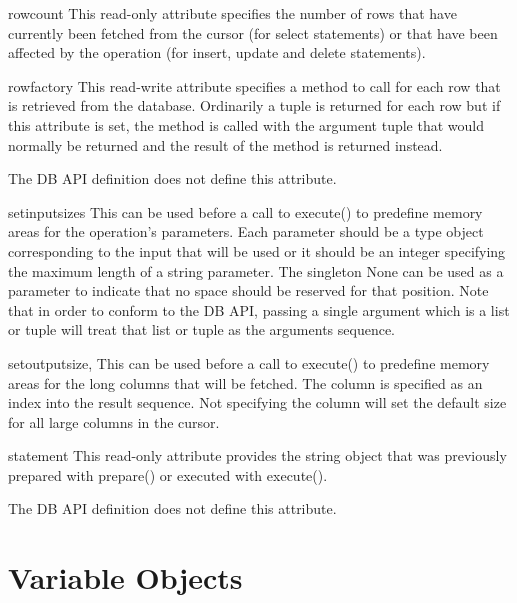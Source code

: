 \documentclass{manual}
\begin{document}
\begin{datadesc}{rowcount}
  This read-only attribute specifies the number of rows that have currently
  been fetched from the cursor (for select statements) or that have been
  affected by the operation (for insert, update and delete statements).
\end{datadesc}

\begin{datadesc}{rowfactory}
  This read-write attribute specifies a method to call for each row that is
  retrieved from the database. Ordinarily a tuple is returned for each row but
  if this attribute is set, the method is called with the argument tuple that
  would normally be returned and the result of the method is returned instead.

   The DB API definition does not define this attribute.
\end{datadesc}

\begin{funcdesc}{setinputsizes}{}
  This can be used before a call to execute() to predefine memory areas for the
  operation's parameters. Each parameter should be a type object corresponding
  to the input that will be used or it should be an integer specifying the
  maximum length of a string parameter. The singleton None can be used as a
  parameter to indicate that no space should be reserved for that position.
  Note that in order to conform to the DB API, passing a single argument which
  is a list or tuple will treat that list or tuple as the arguments sequence.
\end{funcdesc}

\begin{funcdesc}{setoutputsize}{, }
  This can be used before a call to execute() to predefine memory areas for the
  long columns that will be fetched. The column is specified as an index into
  the result sequence. Not specifying the column will set the default size for
  all large columns in the cursor.
\end{funcdesc}

\begin{datadesc}{statement}
  This read-only attribute provides the string object that was previously
  prepared with prepare() or executed with execute().

   The DB API definition does not define this attribute.
\end{datadesc}

\chapter{Variable Objects\label{varobj}}
\end{document}
